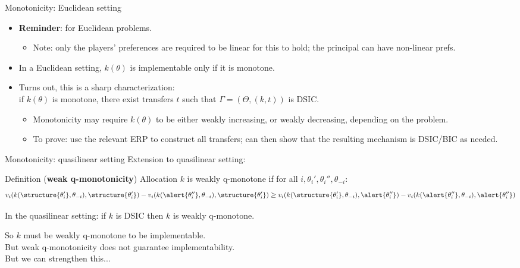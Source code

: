 \documentclass[english,10pt
,aspectratio=169
]{beamer}
\begin{document}
\begin{frame}{Monotonicity: Euclidean setting}
	\begin{itemize}
		\item \textbf{Reminder}:  for Euclidean problems.
		\begin{itemize}
			\item Note: only the players' preferences are required to be linear for this to hold; the principal can have non-linear prefs. 
		\end{itemize}
		\item In a \alert{Euclidean} setting, $k(\theta)$ is implementable only if it is monotone.
		\item Turns out, this is a sharp characterization: \\
		if $k(\theta)$ is monotone, there exist transfers $t$ such that $\Gamma = (\Theta, (k,t))$ is DSIC.
		\begin{itemize}
			\item Monotonicity may require $k(\theta)$ to be either weakly increasing, or weakly decreasing, depending on the problem.
			\item To prove: use the relevant ERP to construct all transfers; can then show that the resulting mechanism is DSIC/BIC as needed.
		\end{itemize}
	\end{itemize}
\end{frame}




\begin{frame}{Monotonicity: quasilinear setting}
	Extension to \alert{quasilinear} setting:
	\begin{exampleblock}{Definition (\textbf{weak q-monotonicity})}
		Allocation $k$ is \alert{weakly q-monotone} if for all $i,\theta_i',\theta_i'',\theta_{-i}$:
		\begin{equation*}
			v_{i}(k(\structure{\theta_{i}'}, \theta_{-i}), \structure{\theta_{i}'}) - 
			v_{i}(k(\alert{\theta_{i}''}, \theta_{-i}), \structure{\theta_{i}'}) 
			\geq 
			v_{i}(k(\structure{\theta_{i}'}, \theta_{-i}), \alert{\theta_{i}''}) - 
			v_{i}(k(\alert{\theta_{i}''}, \theta_{-i}), \alert{\theta_{i}''}) 
		\end{equation*}
	\end{exampleblock}
	\begin{theorem}
		In the quasilinear setting: if $k$ is DSIC then $k$ is weakly q-monotone.
	\end{theorem}
	So $k$ must be weakly q-monotone to be implementable.\\ 
	But weak q-monotonicity does not guarantee implementability. \\
	But we can strengthen this...
\end{frame}
\end{document}
